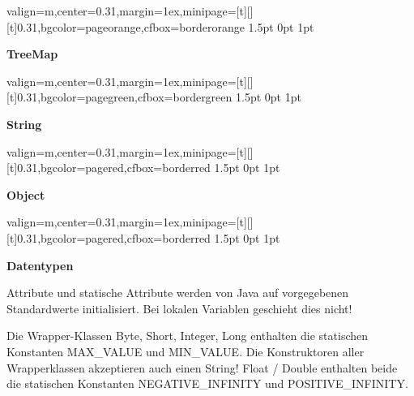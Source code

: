 \documentclass[11pt, a4paper, landscape]{article}
\newcommand{\fancyheader}[1]{
	\centerline{\sffamily \textbf{ \large #1}}
}
\newenvironment{fancybox}[2]
{
	\begin{adjustbox}{valign=m,center=0.31\textwidth,margin=1ex,minipage=[t][][t]{0.31\textwidth},bgcolor=#1,cfbox=#2 1.5pt 0pt 1pt}
	\begin{centering}
}
{
	\end{centering}
	\end{adjustbox}
}
\begin{document}
\begin{multicols}{3}
\begin{fancybox}{pageorange}{borderorange}
\fancyheader{TreeMap}

\end{fancybox}

\begin{fancybox}{pagegreen}{bordergreen}
\fancyheader{String}

\end{fancybox}

\begin{fancybox}{pagered}{borderred}
\fancyheader{Object}

\end{fancybox}

\begin{fancybox}{pagered}{borderred}
\fancyheader{Datentypen}
\raggedright {
Attribute und statische Attribute werden von Java auf vorgegebenen Standardwerte initialisiert. Bei lokalen Variablen geschieht dies nicht!
}

\vspace{3mm}


\vspace{3mm}
\raggedright {
	Die Wrapper-Klassen {\ttfamily Byte}, {\ttfamily Short}, {\ttfamily Integer}, {\ttfamily Long} enthalten die statischen Konstanten {\ttfamily MAX_VALUE} und {\ttfamily MIN_VALUE}. Die Konstruktoren aller Wrapperklassen akzeptieren auch einen String! \newline
	{\ttfamily Float} / {\ttfamily Double} enthalten beide die statischen Konstanten {\ttfamily NEGATIVE_INFINITY} und {\ttfamily POSITIVE_INFINITY}.
}
\end{fancybox}


\end{multicols}
\end{document}
